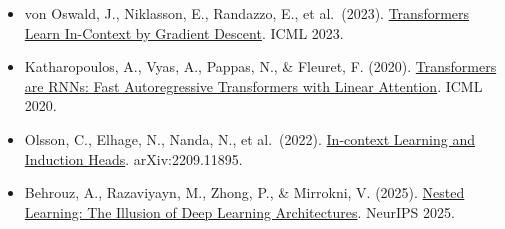 \vspace{0.25em}
\begin{itemize}
\tightlist
\item
  von Oswald, J., Niklasson, E., Randazzo, E., et al.~(2023). \href{https://arxiv.org/abs/2212.07677}{Transformers Learn In-Context by Gradient Descent}. ICML 2023.
\item
  Katharopoulos, A., Vyas, A., Pappas, N., \& Fleuret, F. (2020). \href{https://arxiv.org/abs/2006.16236}{Transformers are RNNs: Fast Autoregressive Transformers with Linear Attention}. ICML 2020.
\item
  Olsson, C., Elhage, N., Nanda, N., et al.~(2022). \href{https://arxiv.org/abs/2209.11895}{In-context Learning and Induction Heads}. arXiv:2209.11895.
\item
  Behrouz, A., Razaviyayn, M., Zhong, P., \& Mirrokni, V. (2025). \href{https://arxiv.org/abs/2512.24695}{Nested Learning: The Illusion of Deep Learning Architectures}. NeurIPS 2025.
\end{itemize}

\clearpage
